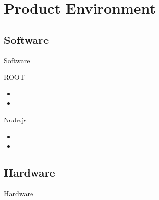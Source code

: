 \section{Product Environment}

\subsection{Software}
\begin{frame}{Software}
  \begin{block}{ROOT}
    \begin{itemize}
      \item
      \item
    \end{itemize}
  \end{block}

  \pause

  \begin{block}{Node.js}
    \begin{itemize}
      \item
      \item
    \end{itemize}
  \end{block}
\end{frame}

\subsection{Hardware}
\begin{frame}{Hardware}

\end{frame}
